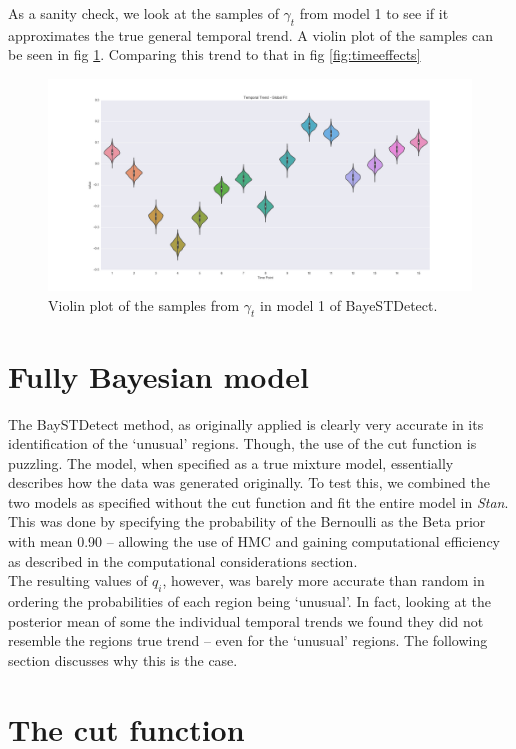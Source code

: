 \documentclass[11pt]{report}
\begin{document}
As a sanity check, we look at the samples of $\gamma_t$ from model 1 to see if it approximates the true general temporal trend. A violin plot of the samples can be seen in fig \ref{fig:temporaltrend}. Comparing this trend to that in fig \ref{fig:timeeffects}
\begin{figure}
\centering
\label{fig:temporaltrend}
\includegraphics[width=\textwidth]{global_temporal}
\caption{Violin plot of the samples from $\gamma_t$ in model 1 of BayeSTDetect.}
\end{figure}

\section{Fully Bayesian model}

The BaySTDetect method, as originally applied is clearly very accurate in its identification of the `unusual' regions. Though, the use of the cut function is puzzling. The model, when specified as a true mixture model, essentially describes how the data was generated originally. To test this, we combined the two models as specified without the cut function and fit the entire model in \emph{Stan}. This was done by specifying the probability of the Bernoulli as the Beta prior with mean 0.90 -- allowing the use of HMC and gaining computational efficiency as described in the computational considerations section. \\

The resulting values of $q_i$, however, was barely more accurate than random in ordering the probabilities of each region being `unusual'. In fact, looking at the posterior mean of some the individual temporal trends we found they did not resemble the regions true trend -- even for the `unusual' regions. The following section discusses why this is the case.

\section{The cut function}
\end{document}

